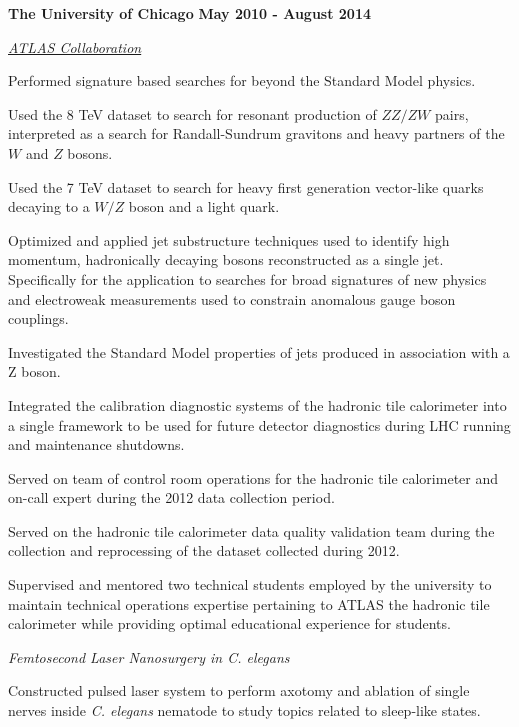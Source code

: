 \documentclass[10pt]{article}
\newenvironment{outerlist}[1][\enskip\textbullet]%
        {\begin{itemize}[#1]}{\end{itemize}%
         \vspace{-.6\baselineskip}}
\newenvironment{innerlist}[1][\enskip\textbullet]%
        {\begin{compactitem}[#1]}{\end{compactitem}}
\begin{document}
\textbf{The University of Chicago}    \hfill \textbf{May 2010 - August 2014}
\begin{outerlist}
\item[] \textit{\href{https://atlas.cern/}{ATLAS Collaboration}}%
        \begin{innerlist} 
            \item Performed signature based searches for beyond the Standard Model physics.  
	    \begin{innerlist}
	    \item Used the 8 TeV dataset to search for resonant production of $ZZ/ZW$ pairs, interpreted as a search for Randall-Sundrum gravitons and heavy partners of the $W$ and $Z$ bosons.
	     \item Used the 7 TeV dataset to search for heavy first generation vector-like quarks decaying to a $W/Z$ boson and a light quark.
	    \end{innerlist}
            \item Optimized and applied jet substructure techniques used to identify high momentum, hadronically decaying bosons reconstructed as a single jet.  Specifically for the application to searches for broad signatures of new physics and electroweak measurements used to constrain anomalous gauge boson couplings.
	    \item Investigated the Standard Model properties of jets produced in association with a Z boson. 
            \item Integrated the calibration diagnostic systems of the hadronic tile calorimeter into a single framework to be used for future detector diagnostics during LHC running and maintenance shutdowns.
             \item Served on team of control room operations for the hadronic tile calorimeter and on-call expert during the 2012 data collection period.            
	     \item Served on the hadronic tile calorimeter data quality validation team during the collection and reprocessing of the dataset collected during 2012.
             \item Supervised and mentored two technical students employed by the university to maintain technical operations expertise pertaining to ATLAS the hadronic tile calorimeter while providing optimal educational experience for students.  
        \end{innerlist}
  	
\item[] \textit{Femtosecond Laser Nanosurgery in \textit{C. elegans}}%
        \begin{innerlist}
            \item Constructed pulsed laser system to perform axotomy and ablation of single nerves inside \textit{C. elegans} nematode to study topics related to sleep-like states.
        \end{innerlist}
    

\end{outerlist}
\end{document}
